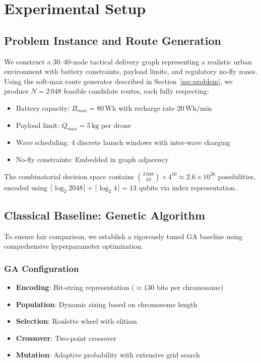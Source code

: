 \section{Experimental Setup}
\label{sec:experiments}

\subsection{Problem Instance and Route Generation}

We construct a 30--40-node tactical delivery graph representing a realistic urban environment with battery constraints, payload limits, and regulatory no-fly zones.
Using the soft-max route generator described in Section~\ref{sec:problem}, we produce $N = 2\,048$ feasible candidate routes, each fully respecting:
\begin{itemize}[nosep]
    \item Battery capacity: $B_{max} = 80\,\text{Wh}$ with recharge rate $20\,\text{Wh/min}$
    \item Payload limit: $Q_{max} = 5\,\text{kg}$ per drone
    \item Wave scheduling: 4 discrete launch windows with inter-wave charging
    \item No-fly constraints: Embedded in graph adjacency
\end{itemize}

The combinatorial decision space contains ${2\,048 \choose 10} \times 4^{10} \approx 2.6 \times 10^{26}$ possibilities, encoded using $\lceil\log_2 2048\rceil + \lceil\log_2 4\rceil = 13$ qubits via index representation.


\subsection{Classical Baseline: Genetic Algorithm}

To ensure fair comparison, we establish a rigorously tuned GA baseline using comprehensive hyperparameter optimization.

\subsubsection{GA Configuration}
\begin{itemize}[nosep]
    \item \textbf{Encoding}: Bit-string representation ($\approx 130$ bits per chromosome)
    \item \textbf{Population}: Dynamic sizing based on chromosome length 
    \item \textbf{Selection}: Roulette wheel with elitism
    \item \textbf{Crossover}: Two-point crossover
    \item \textbf{Mutation}: Adaptive probability with extensive grid search
\end{itemize}

